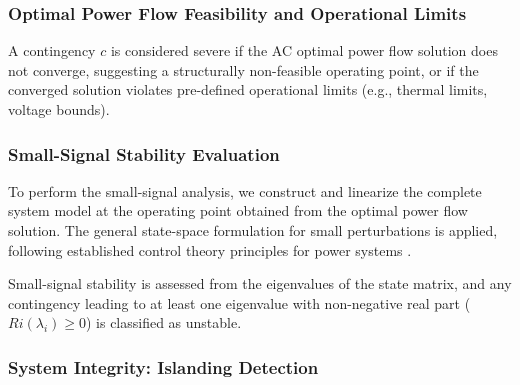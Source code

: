 \documentclass[journal]{IEEEtran}
\begin{document}
\subsubsection{Optimal Power Flow Feasibility and Operational Limits}
A contingency $c$ is considered severe if the AC optimal power flow solution does not converge, suggesting a structurally non-feasible operating point, or if the converged solution violates pre-defined operational limits (e.g., thermal limits, voltage bounds).

\subsubsection{Small-Signal Stability Evaluation}

To perform the small-signal analysis, we construct and linearize the complete system model at the operating point obtained from the optimal power flow solution. The general state-space formulation for small perturbations is applied, following established control theory principles for power systems \cite{pal2006}.


Small-signal stability is assessed from the eigenvalues of the state matrix, and any contingency leading to at least one eigenvalue with non-negative real part ($Ri(\lambda_i) \ge 0$) is classified as unstable.


\subsubsection{System Integrity: Islanding Detection}
\label{sec:illes}
\end{document}
